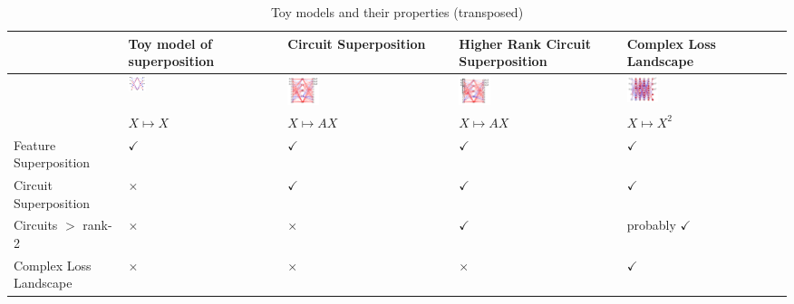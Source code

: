 \documentclass{article}
\theoremstyle{plain}
\theoremstyle{definition}
\theoremstyle{remark}
\begin{document}
\begin{table}[htb]
    \centering
    \begin{tabularx}{\textwidth}{X X X X X}  %
        \toprule
         & Toy model of superposition & Circuit Superposition & Higher Rank Circuit Superposition & Complex Loss Landscape \\  
        \midrule

        \hline
        & \includegraphics[width=0.12\textwidth]{../figures/2a_toy_models_setup.pdf} &
        \includegraphics[width=0.2\textwidth]{../figures/2b_toy_models_setup.pdf} &
        \includegraphics[width=0.2\textwidth]{../figures/2c_toy_models_setup.pdf} &
        \includegraphics[width=0.2\textwidth]{../figures/2d_toy_models_setup.pdf} \\
         & $X \mapsto X$ & $X \mapsto A X$ & $X \mapsto A X$ & $X \mapsto X^2$ \\  
        Feature Superposition & $\checkmark$ & $\checkmark$ & $\checkmark$ & $\checkmark$ \\  
        Circuit Superposition & $\times$ & $\checkmark$ & $\checkmark$ & $\checkmark$ \\  
        Circuits $>$ rank-2 & $\times$ & $\times$ & $\checkmark$ & probably $\checkmark$ \\  
        Complex Loss Landscape & $\times$ & $\times$ & $\times$ & $\checkmark$ \\  
        \bottomrule
    \end{tabularx}
    \caption{Toy models and their properties (transposed)}
    \label{tab:toy_models_transposed}
\end{table}
\end{document}
